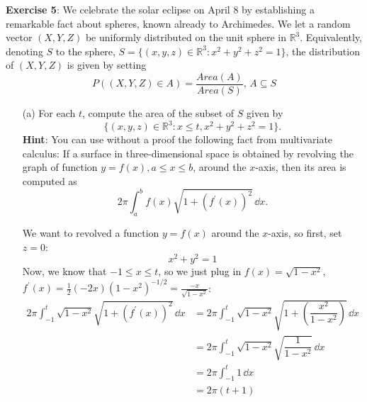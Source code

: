 \documentclass{article}
\begin{document}
\textbf{Exercise 5}: We celebrate the solar eclipse on April $8$ by establishing a remarkable fact about spheres, known already to Archimedes. We let a random vector $(X, Y, Z)$ be uniformly distributed on the unit sphere in $\mathbb{R}^{3}$. Equivalently, denoting $S$ to the sphere, $S = \{(x, y, z) \in \mathbb{R}^{3} : x^{2} + y^{2} + z^{2} = 1\}$, the distribution of $(X, Y, Z)$ is given by setting
    \begin{equation*}
        P((X, Y, Z) \in A) = \dfrac{Area(A)}{Area(S)}, \, A \subseteq S
    \end{equation*}
    \begin{itemize}
        \item [(a)] For each $t$, compute the area of the subset of $S$ given by
            \begin{equation*}
                \{(x, y, z) \in \mathbb{R}^{3} : x \leq t, x^{2} + y^{2} + z^{2} = 1\}.
            \end{equation*}
            \textbf{Hint}: You can use without a proof the following fact from multivariate calculus: If a surface in three-dimensional space is obtained by revolving the graph of function $y = f(x), a \leq x \leq b$, around the $x$-axis, then its area is computed as 
                \begin{equation*}
                    2\pi \int_{a}^{b} f(x)\sqrt{1 + (f^{\prime}(x))^{2}} \, \dd{x} .
                \end{equation*}
            \begin{answer}
                We want to revolved a function $y  = f(x )$ around the $x$-axis, so first, set $z = 0$:
                    \begin{equation*}
                        x^{2} + y^{2} = 1
                    \end{equation*}
                Now, we know that $-1 \leq x \leq t$, so we just plug in $f(x) = \sqrt{1 - x^{2}}$, $f^{\prime}(x) = \frac{1}{2}(-2x)(1 - x^{2})^{-1/2} = \frac{-x}{\sqrt{1 - x^{2}}}$:
                    \begin{align*}
                        2\pi \int_{-1}^{t} \sqrt{1 - x^{2}}\sqrt{1 + (f^{\prime}(x))^{2}} \, \dd{x} &= 2\pi \int_{-1}^{t} \sqrt{1 - x^{2}}\sqrt{1 + \left(\dfrac{x^{2}}{1 - x^{2}}\right)} \, \dd{x}  \\
                        &= 2\pi \int_{-1}^{t} \sqrt{1 - x^{2}}\sqrt{\dfrac{1}{1 - x^{2}}} \, \dd{x}  \\
                        &= 2\pi \int_{-1}^{t} 1 \, \dd{x} \\
                        &= 2\pi (t + 1)
                    \end{align*}
            \end{answer}


\end{itemize}
\end{document}
